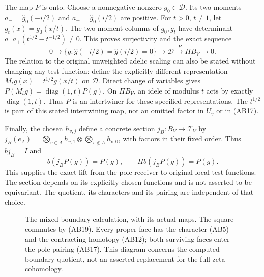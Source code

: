 \documentclass[11pt,a4paper]{article}
\theoremstyle{definition}\newtheorem{definition}[theorem]{Definition}
\newcommand{\C}{\mathbb C}\newcommand{\R}{\mathbb R}
\begin{document}
The map $P$ is onto. Choose a nonnegative nonzero $g_0\in\mathcal D$.
Its two moments $a_-=\widehat g_0(-i/2)$ and
$a_+=\widehat g_0(i/2)$ are positive. For $t>0$, $t\ne1$, let
$g_t(x)=g_0(x/t)$. The two moment columns of $g_0,g_t$ have determinant
$a_-a_+(t^{1/2}-t^{-1/2})\ne0$. This proves surjectivity and the exact
sequence
\[
 0\longrightarrow\{g:\widehat g(-i/2)=\widehat g(i/2)=0\}
 \longrightarrow\mathcal D\xrightarrow{P}\Pi B_V\longrightarrow0.
 \tag{AB18}
\]
The relation to the original unweighted adelic scaling can also be stated
without changing any test function: define the explicitly different
representation $M_tg(x)=t^{1/2}g(x/t)$ on $\mathcal D$. Direct change of
variables gives $P(M_tg)=\operatorname{diag}(1,t)P(g)$. On $\Pi B_V$,
an idele of modulus $t$ acts by exactly $\operatorname{diag}(1,t)$.
Thus $P$ is an intertwiner for these specified representations. The
$t^{1/2}$ is part of this stated intertwining map, not an omitted factor
in $U_\gamma$ or in (AB17).

Finally, the chosen $h_{v,j}$ define a concrete section
$j_B:B_V\to\mathcal T_V$ by
$j_B(e_A)=\bigotimes_{v\in A}h_{v,1}\otimes
\bigotimes_{v\notin A}h_{v,0}$, with factors in their fixed order.
Thus $bj_B=I$ and
\[
 b(j_BP(g))=P(g),\qquad \Pi b(j_BP(g))=P(g).
 \tag{AB19}
\]
This supplies the exact lift from the pole receiver to original local test
functions. The section depends on its explicitly chosen functions and is
not asserted to be equivariant. The quotient, its characters and its
pairing are independent of that choice.

\begin{figure}[ht]
\centering
{}
\caption{The mixed boundary calculation, with its actual maps. The square
commutes by (AB19). Every proper face has the character (AB5) and the
contracting homotopy (AB12); both surviving faces enter the pole pairing
(AB17). This diagram concerns the computed boundary quotient, not an
asserted replacement for the full zeta cohomology.}
\end{figure}
\end{document}
